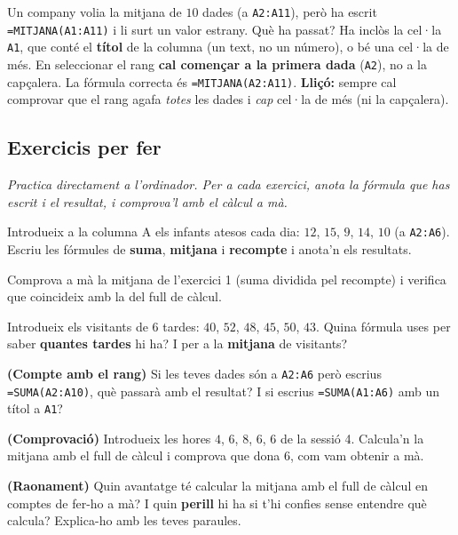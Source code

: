 \begin{exresolt}
Un company volia la mitjana de $10$ dades (a \texttt{A2:A11}), però ha escrit
\texttt{=MITJANA(A1:A11)} i li surt un valor estrany. Què ha passat?
\solucio
Ha inclòs la cel·la \texttt{A1}, que conté el \textbf{títol} de la columna (un text,
no un número), o bé una cel·la de més. En seleccionar el rang \textbf{cal començar a
la primera dada} (\texttt{A2}), no a la capçalera. La fórmula correcta és
\texttt{=MITJANA(A2:A11)}. \textbf{Lliçó:} sempre cal comprovar que el rang agafa
\emph{totes} les dades i \emph{cap} cel·la de més (ni la capçalera).
\end{exresolt}

\subsection{Exercicis per fer}

\noindent\textit{Practica directament a l'ordinador. Per a cada exercici, anota la
fórmula que has escrit i el resultat, i comprova'l amb el càlcul a mà.}

\begin{exercicis}
\begin{exlist}
  \item Introdueix a la columna A els infants atesos cada dia: $12$, $15$, $9$, $14$,
        $10$ (a \texttt{A2:A6}). Escriu les fórmules de \textbf{suma}, \textbf{mitjana}
        i \textbf{recompte} i anota'n els resultats.
  \item Comprova a mà la mitjana de l'exercici 1 (suma dividida pel recompte) i
        verifica que coincideix amb la del full de càlcul.
  \item Introdueix els visitants de $6$ tardes: $40$, $52$, $48$, $45$, $50$, $43$.
        Quina fórmula uses per saber \textbf{quantes tardes} hi ha? I per a la
        \textbf{mitjana} de visitants?
  \item \textbf{(Compte amb el rang)} Si les teves dades són a \texttt{A2:A6} però
        escrius \texttt{=SUMA(A2:A10)}, què passarà amb el resultat? I si escrius
        \texttt{=SUMA(A1:A6)} amb un títol a \texttt{A1}?
  \item \textbf{(Comprovació)} Introdueix les hores $4$, $6$, $8$, $6$, $6$ de la
        sessió 4. Calcula'n la mitjana amb el full de càlcul i comprova que dona $6$,
        com vam obtenir a mà.
  \item \textbf{(Raonament)} Quin avantatge té calcular la mitjana amb el full de
        càlcul en comptes de fer-ho a mà? I quin \textbf{perill} hi ha si t'hi
        confies sense entendre què calcula? Explica-ho amb les teves paraules.
\end{exlist}
\end{exercicis}

